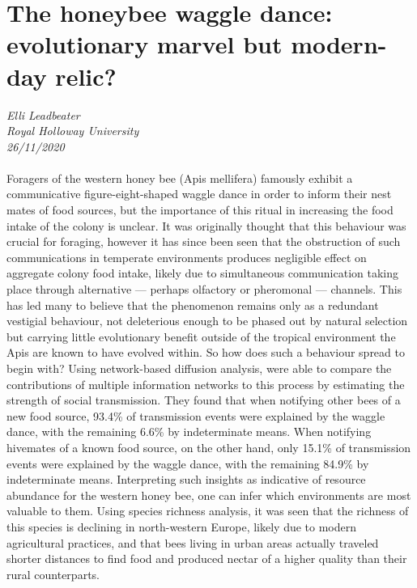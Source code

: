 \documentclass[11pt]{article}
\begin{document}
\section{The honeybee waggle dance: evolutionary marvel but modern-day relic?}
\textit{Elli Leadbeater\\Royal Holloway University\\26/11/2020}
\\
\\Foragers of the western honey bee (Apis mellifera) famously exhibit a communicative figure-eight-shaped waggle dance in order to inform their nest mates of food sources, but the importance of this ritual in increasing the food intake of the colony is unclear. It was originally thought that this behaviour was crucial for foraging, however it has since been seen that the obstruction of such communications in temperate environments produces negligible effect on aggregate colony food intake, likely due to simultaneous communication taking place through alternative — perhaps olfactory or pheromonal — channels. This has led many to believe that the phenomenon remains only as a redundant vestigial behaviour, not deleterious enough to be phased out by natural selection but carrying little evolutionary benefit outside of the tropical environment the Apis are known to have evolved within. So how does such a behaviour spread to begin with? Using network-based diffusion analysis, \cite{leadbeater2019honeybee} were able to compare the contributions of multiple information networks to this process by estimating the strength of social transmission. They found that when notifying other bees of a new food source, 93.4\% of transmission events were explained by the waggle dance, with the remaining 6.6\% by indeterminate means. When notifying hivemates of a known food source, on the other hand, only 15.1\% of transmission events were explained by the waggle dance, with the remaining 84.9\% by indeterminate means. Interpreting such insights as indicative of resource abundance for the western honey bee, one can infer which environments are most valuable to them. Using species richness analysis, it was seen that the richness of this species is declining in north-western Europe, likely due to modern agricultural practices, and that bees living in urban areas actually traveled shorter distances to find food and produced nectar of a higher quality than their rural counterparts.
\end{document}
